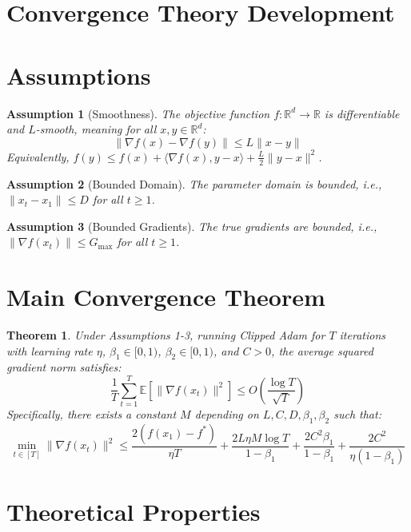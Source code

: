 \documentclass{article}
\newtheorem{theorem}{Theorem}
\newtheorem{assumption}{Assumption}
\begin{document}
\section*{Convergence Theory Development}

\section*{Assumptions}

\begin{assumption}[Smoothness]
The objective function $f: \mathbb{R}^d \to \mathbb{R}$ is differentiable and $L$-smooth, meaning for all $x, y \in \mathbb{R}^d$:
$$ \|\nabla f(x) - \nabla f(y)\| \leq L \|x - y\| $$
Equivalently, $f(y) \leq f(x) + \langle \nabla f(x), y - x \rangle + \frac{L}{2} \|y - x\|^2 $.
\end{assumption}

\begin{assumption}[Bounded Domain]
The parameter domain is bounded, i.e., $\|x_t - x_1\| \leq D$ for all $t \geq 1$.
\end{assumption}

\begin{assumption}[Bounded Gradients]
The true gradients are bounded, i.e., $\|\nabla f(x_t)\| \leq G_{\max}$ for all $t \geq 1$.
\end{assumption}

\section*{Main Convergence Theorem}

\begin{theorem}
Under Assumptions 1-3, running Clipped Adam for $T$ iterations with learning rate $\eta$, $\beta_1 \in [0, 1)$, $\beta_2 \in [0, 1)$, and $C > 0$, the average squared gradient norm satisfies:
$$ \frac{1}{T} \sum_{t=1}^T \mathbb{E}[\|\nabla f(x_t)\|^2] \leq O\left(\frac{\log T}{\sqrt{T}}\right) $$
Specifically, there exists a constant $M$ depending on $L, C, D, \beta_1, \beta_2$ such that:
$$ \min_{t \in [T]} \|\nabla f(x_t)\|^2 \leq \frac{2(f(x_1) - f^*)}{\eta T} + \frac{2L\eta M \log T}{1-\beta_1} + \frac{2C^2 \beta_1}{1-\beta_1} + \frac{2C^2}{\eta(1-\beta_1)} $$
\end{theorem}

\section*{Theoretical Properties}
\end{document}
